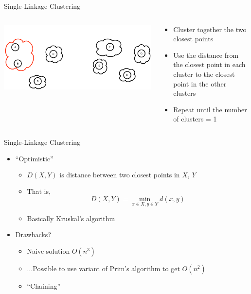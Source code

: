 \documentclass[aspectratio=169]{beamer}
\begin{document}
\begin{frame}{Single-Linkage Clustering}

\begin{columns}
\begin{column}{0.5\textwidth}
\includegraphics[width=1\textwidth]{./lectUL/minLinkageClustering3.pdf}
\end{column}
\begin{column}{0.5\textwidth}
\begin{itemize}
\item Cluster together the two closest points
\item Use the distance from the closest point in each cluster to the closest point in the other clusters
\item Repeat until the number of clusters = 1
\end{itemize}
\end{column}
\end{columns}
\end{frame}
\begin{frame}{Single-Linkage Clustering}

\begin{itemize}
\item ``Optimistic''
\begin{itemize}
	\item $D(X, Y)$ is distance between two closest points in $X$, $Y$
	\item That is, 
	$$D(X, Y) = \min_{x \in X, y \in Y} d(x, y)$$
	\item Basically Kruskal's algorithm
\end{itemize}
\item Drawbacks?
	\begin{itemize}
	\item Naive solution $O(n^3)$ %
	\item ...Possible to use variant of Prim's algorithm to get $O(n^2)$
	\item ``Chaining''
	\end{itemize}
\end{itemize}
\end{frame}
\end{document}
